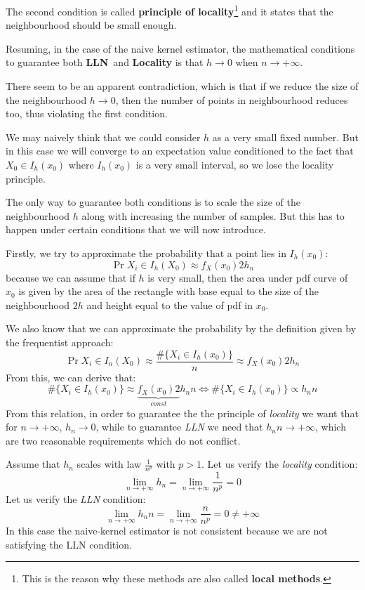 The second condition is called \textbf{principle of locality}\footnote{This is the reason why these methods are also called \textbf{local methods}.} and it states that the neighbourhood should be small enough. 

Resuming, in the case of the naive kernel estimator, the mathematical conditions to guarantee both \textbf{LLN} and \textbf{Locality} is that $h \to 0$ when $n \to +\infty$.

There seem to be an apparent contradiction, which is that if we reduce the size of the neighbourhood $h \to 0$, then the number of points in neighbourhood reduces too, thus violating the first condition.

We may naively think that we could consider $h$ as a very small fixed number. But in this case we will converge to an expectation value conditioned to the fact that $X_0\in I_h(x_0)$ where $I_h(x_0)$ is a very small interval, so we lose the locality principle.

The only way to guarantee both conditions is to scale the size of the neighbourhood $h$ along with increasing the number of samples. But this has to happen under certain conditions that we will now introduce.

Firstly, we try to approximate the probability that a point lies in $I_h(x_0)$:
\[
    \Pr{X_i \in I_h(X_0)} \approx f_X(x_0) 2 h_n
\]
because we can assume that if $h$ is very small, then the area under pdf curve of $x_0$ is given by the area of the rectangle with base equal to the size of the neighbourhood $2h$ and height equal to the value of pdf in $x_0$. %

We also know that we can approximate the probability by the definition given by the frequentist approach:
\[
    \Pr{X_i \in I_n(X_0)} \approx \frac{\#\{X_i \in I_h(x_0)\}}{n} \approx f_X(x_0) 2 h_n
\]
From this, we can derive that:
\[
    \#\{X_i \in I_h(x_0)\} \approx \underbrace{f_X(x_0) 2}_{const} h_n n \iff \#\{X_i \in I_h(x_0)\} \propto h_n n
\]
From this relation, in order to guarantee the the principle of \textit{locality} we want that for $n \to +\infty$, $h_n \to 0$, while to guarantee \textit{LLN} we need that $h_n n \to +\infty$, which are two reasonable requirements which do not conflict. %

\begin{exercise}
    Assume that $h_n$ scales with law $\frac{1}{n^p}$ with $p>1$. Let us verify the \textit{locality} condition:
    \[
        \lim_{n \to +\infty} h_n = \lim_{n \to +\infty} \frac{1}{n^p} = 0
    \]
    Let us verify the \textit{LLN} condition:
    \[
        \lim_{n \to +\infty} h_n n = \lim_{n \to +\infty} \frac{n}{n^p} = 0 \neq +\infty
    \]
    In this case the naive-kernel estimator is not consistent because we are not satisfying the LLN condition.
\end{exercise}

